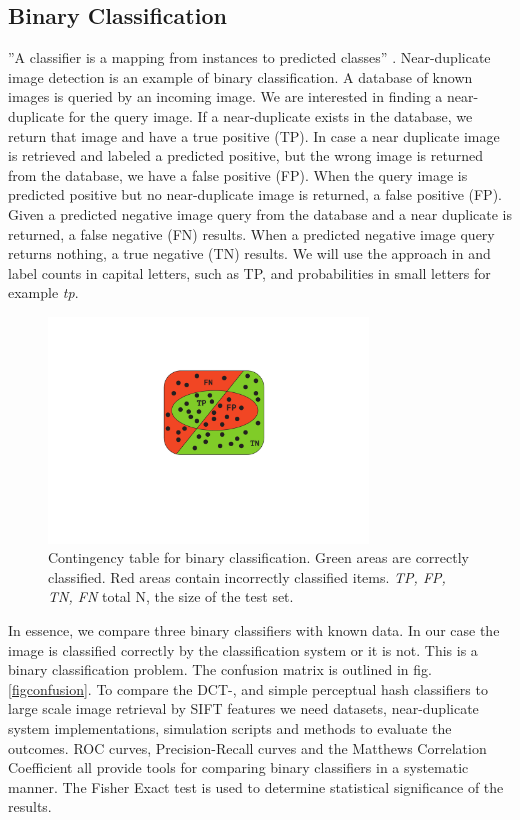 \documentclass[english,12pt,a4paper,pdftex,elec,utf8, table]{aaltothesis}
\begin{document}
\subsection{Binary Classification}
''A classifier is a mapping from instances to predicted classes'' \cite{Fawcett2006}. Near-duplicate image detection is an example of binary classification. A database of known images is queried by an incoming image. We are interested in finding a near-duplicate for the query image. If a near-duplicate exists in the database, we return that image and have a true positive (TP). In case a near duplicate image is retrieved and labeled a predicted positive, but the wrong image is returned from the database, we have a false positive (FP). When the query image is predicted positive but no near-duplicate image is returned, a false positive (FP). Given a predicted negative image query from the database and a near duplicate is returned, a false negative (FN) results. When a predicted negative image query returns nothing, a true negative (TN) results. We will use the approach in \cite{POWERS2011} and label counts in capital letters, such as TP, and probabilities in small letters for example \emph{tp}.
\begin{figure}[htb]
\begin{center}
\includegraphics[height=6cm]{figures/contingency}
\end{center}
\caption{Contingency table for binary classification. Green areas are correctly classified. Red areas contain incorrectly classified items. \emph{TP, FP, TN, FN} total N, the size of the test set.}
\label{figcontingencytable}
\end{figure}
In essence, we compare three binary classifiers with known data. In our case the image is classified correctly by the classification system or it is not. This is a binary classification problem. The confusion matrix is outlined in fig. \ref{figconfusion}. To compare the DCT-, and simple perceptual hash classifiers to large scale image retrieval by SIFT features we need datasets, near-duplicate system implementations, simulation scripts and methods to evaluate the outcomes. ROC curves, Precision-Recall curves and the Matthews Correlation Coefficient all provide tools for comparing binary classifiers in a systematic manner. The Fisher Exact test is used to determine statistical significance of the results.
\end{document}
